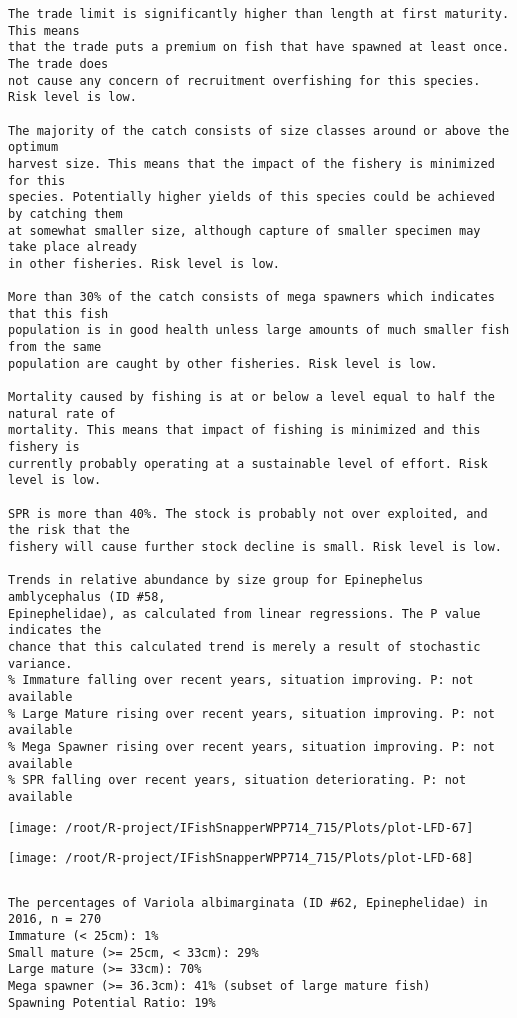 \documentclass{report}\usepackage[]{graphicx}\usepackage[]{color}
\makeatletter
\def\maxwidth{ %
  \ifdim\Gin@nat@width>\linewidth
    \linewidth
  \else
    \Gin@nat@width
  \fi
}
\newenvironment{kframe}{%
 \def\at@end@of@kframe{}%
 \ifinner\ifhmode%
  \def\at@end@of@kframe{\end{minipage}}%
  \begin{minipage}{\columnwidth}%
 \fi\fi%
 \def\FrameCommand##1{\hskip\@totalleftmargin \hskip-\fboxsep
 \colorbox{shadecolor}{##1}\hskip-\fboxsep
     \hskip-\linewidth \hskip-\@totalleftmargin \hskip\columnwidth}%
 \MakeFramed {\advance\hsize-\width
   \@totalleftmargin\z@ \linewidth\hsize
   \@setminipage}}%
 {\par\unskip\endMakeFramed%
 \at@end@of@kframe}
\newenvironment{knitrout}{}{} %
\makeatother
\begin{document}
\begin{knitrout}
\begin{kframe}
\begin{verbatim}
The trade limit is significantly higher than length at first maturity.  This means
that the trade puts a premium on fish that have spawned at least once. The trade does
not cause any concern of recruitment overfishing for this species. Risk level is low.

The majority of the catch consists of size classes around or above the optimum
harvest size. This means that the impact of the fishery is minimized for this
species. Potentially higher yields of this species could be achieved by catching them
at somewhat smaller size, although capture of smaller specimen may take place already
in other fisheries. Risk level is low.

More than 30% of the catch consists of mega spawners which indicates that this fish
population is in good health unless large amounts of much smaller fish from the same
population are caught by other fisheries. Risk level is low.
 
Mortality caused by fishing is at or below a level equal to half the natural rate of
mortality. This means that impact of fishing is minimized and this fishery is
currently probably operating at a sustainable level of effort. Risk level is low.
 
SPR is more than 40%. The stock is probably not over exploited, and the risk that the
fishery will cause further stock decline is small. Risk level is low.
 
Trends in relative abundance by size group for Epinephelus amblycephalus (ID #58,
Epinephelidae), as calculated from linear regressions. The P value indicates the
chance that this calculated trend is merely a result of stochastic variance.
% Immature falling over recent years, situation improving. P: not available
% Large Mature rising over recent years, situation improving. P: not available
% Mega Spawner rising over recent years, situation improving. P: not available
% SPR falling over recent years, situation deteriorating. P: not available
\end{verbatim}
\end{kframe}
\texttt{[image: /root/R-project/IFishSnapperWPP714\_715/Plots/plot-LFD-67]} 

\texttt{[image: /root/R-project/IFishSnapperWPP714\_715/Plots/plot-LFD-68]} 
\begin{kframe}\begin{verbatim}
\end{verbatim}
\end{kframe}
\clearpage
\newpage
\begin{kframe}\begin{verbatim}The percentages of Variola albimarginata (ID #62, Epinephelidae) in 2016, n = 270
Immature (< 25cm): 1%
Small mature (>= 25cm, < 33cm): 29%
Large mature (>= 33cm): 70%
Mega spawner (>= 36.3cm): 41% (subset of large mature fish)
Spawning Potential Ratio: 19%
 

\end{verbatim}
\end{kframe}
\end{knitrout}
\end{document}
